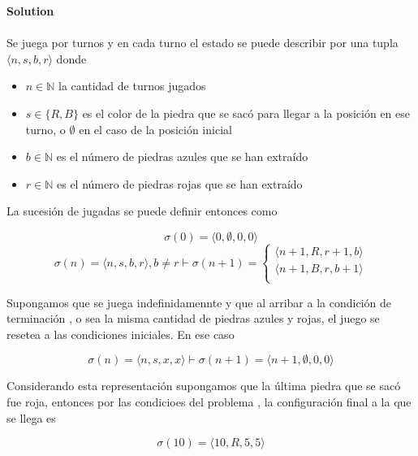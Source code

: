 \noindent\textbf{Solution } \\\\

Se juega por turnos y en cada turno el estado se puede describir por una tupla $\langle n, s, b, r \rangle$ donde 

\begin{itemize}
	\item{$n \in \mathbb{N}$ la cantidad de turnos jugados}
	\item{$s \in \{R, B\}$ es el color de la piedra que se sacó para llegar a la posición en ese turno, o $\emptyset$ en el caso de la posición inicial}
	\item{$b \in \mathbb{N}$ es el número de piedras azules que se han extraído}
	\item{$r \in \mathbb{N}$  es el número de piedras rojas que se han extraído}
\end{itemize}

La sucesión de jugadas se puede definir entonces como

\begin{equation} \label{eq_91_rmc2007dr072_1}
	\sigma(0) = \langle 0, \emptyset,0,0 \rangle 
\end{equation}
\begin{equation} \label{eq_91_rmc2007dr072_2}
	\sigma(n) =  \langle n, s, b, r \rangle, b \neq r \vdash \sigma(n+1) =
	\begin{cases}
		\langle n+1, R,r+1,b \rangle \\
		\langle n+1, B,r,b+1 \rangle \\
	\end{cases}
\end{equation}

Supongamos que se juega indefinidamennte y que al arribar a la condición de terminación , o sea la misma cantidad de piedras azules y rojas, el juego se resetea a las condiciones iniciales. En ese caso

\begin{equation} \label{eq_91_rmc2007dr072_3}
	\sigma(n) =  \langle n, s, x, x \rangle \vdash \sigma(n+1) = \langle n+1, \emptyset,0,0 \rangle
\end{equation}

Considerando esta representación supongamos que la última piedra que se sacó fue roja, entonces por las condicioes del problema , la configuración final a la que se llega es

\begin{equation} \label{eq_91_rmc2007dr072_4}
	\sigma(10) = \langle 10, R, 5, 5 \rangle
\end{equation}

